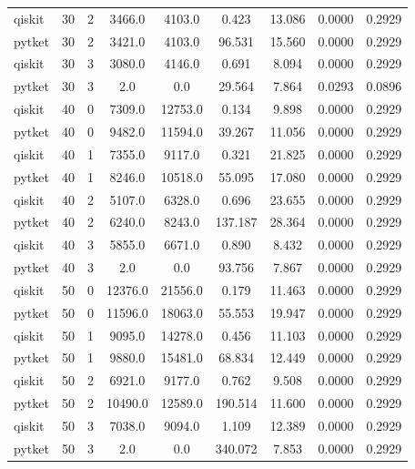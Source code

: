 \begin{table}[htbp]
{\begin{tabular}{llccccccc}
qiskit & 30 & 2 & 3466.0 & 4103.0 & 0.423 & 13.086 & 0.0000 & 0.2929 \\
pytket & 30 & 2 & 3421.0 & 4103.0 & 96.531 & 15.560 & 0.0000 & 0.2929 \\
qiskit & 30 & 3 & 3080.0 & 4146.0 & 0.691 & 8.094 & 0.0000 & 0.2929 \\
pytket & 30 & 3 & 2.0 & 0.0 & 29.564 & 7.864 & 0.0293 & 0.0896 \\
qiskit & 40 & 0 & 7309.0 & 12753.0 & 0.134 & 9.898 & 0.0000 & 0.2929 \\
pytket & 40 & 0 & 9482.0 & 11594.0 & 39.267 & 11.056 & 0.0000 & 0.2929 \\
qiskit & 40 & 1 & 7355.0 & 9117.0 & 0.321 & 21.825 & 0.0000 & 0.2929 \\
pytket & 40 & 1 & 8246.0 & 10518.0 & 55.095 & 17.080 & 0.0000 & 0.2929 \\
qiskit & 40 & 2 & 5107.0 & 6328.0 & 0.696 & 23.655 & 0.0000 & 0.2929 \\
pytket & 40 & 2 & 6240.0 & 8243.0 & 137.187 & 28.364 & 0.0000 & 0.2929 \\
qiskit & 40 & 3 & 5855.0 & 6671.0 & 0.890 & 8.432 & 0.0000 & 0.2929 \\
pytket & 40 & 3 & 2.0 & 0.0 & 93.756 & 7.867 & 0.0000 & 0.2929 \\
qiskit & 50 & 0 & 12376.0 & 21556.0 & 0.179 & 11.463 & 0.0000 & 0.2929 \\
pytket & 50 & 0 & 11596.0 & 18063.0 & 55.553 & 19.947 & 0.0000 & 0.2929 \\
qiskit & 50 & 1 & 9095.0 & 14278.0 & 0.456 & 11.103 & 0.0000 & 0.2929 \\
pytket & 50 & 1 & 9880.0 & 15481.0 & 68.834 & 12.449 & 0.0000 & 0.2929 \\
qiskit & 50 & 2 & 6921.0 & 9177.0 & 0.762 & 9.508 & 0.0000 & 0.2929 \\
pytket & 50 & 2 & 10490.0 & 12589.0 & 190.514 & 11.600 & 0.0000 & 0.2929 \\
qiskit & 50 & 3 & 7038.0 & 9094.0 & 1.109 & 12.389 & 0.0000 & 0.2929 \\
pytket & 50 & 3 & 2.0 & 0.0 & 340.072 & 7.853 & 0.0000 & 0.2929 \\
\bottomrule
\end{tabular}%
}
\end{table}